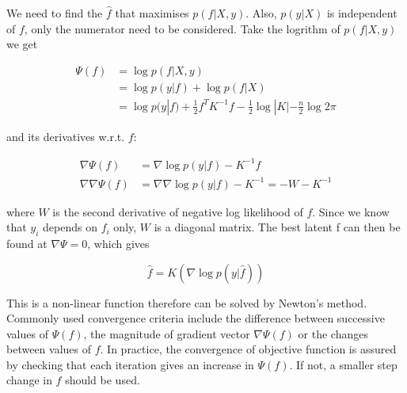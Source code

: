 \documentclass[14pt]{report}
\numberwithin{equation}{chapter}
\begin{document}
\begin{spacing}{2}
We need to find the $\hat{f}$ that maximises $p(f|X,y)$. Also, $p(y|X)$ is independent of $f$, only the numerator need to be considered. Take the logrithm of $p(f|X,y)$ we get

\begin{equation}
\begin{split}
\Psi(f) & = \operatorname{log}p(f|X,y) \\
& = \operatorname{log}p(y|f) + \operatorname{log}p(f|X) \\
& = \operatorname{log}p(y|f) + \frac{1}{2}f^TK^{-1}f - \frac{1}{2}\operatorname{log}|K| - \frac{n}{2}\operatorname{log}2\pi
\end{split}
\end{equation}

and its derivatives w.r.t. $f$:

\begin{align}
\nabla\Psi(f) & = \nabla\operatorname{log}p(y|f) - K^{-1}f \\
\nabla\nabla\Psi(f) & = \nabla\nabla\operatorname{log}p(y|f) - K^{-1} = -W - K^{-1}
\end{align}

where $W$ is the second derivative of negative log likelihood of $f$. Since we know that $y_i$ depends on $f_i$ only, $W$ is a diagonal matrix. The best latent f can then be found at $\nabla\Psi = 0$, which gives 

\begin{equation}
\label{optimised_f}
\hat{f} = K(\nabla \operatorname{log}p(y|\hat{f}))
\end{equation}

This is a non-linear function therefore can be solved by Newton's method. Commonly used convergence criteria include the difference between successive values of $\Psi (f)$, the magnitude of gradient vector $\nabla\Psi (f)$ or the changes between values of $f$. In practice, the convergence of objective function is assured by checking that each iteration gives an increase in $\Psi (f)$. If not, a smaller step change in $f$ should be used. 


\end{spacing}
\end{document}

